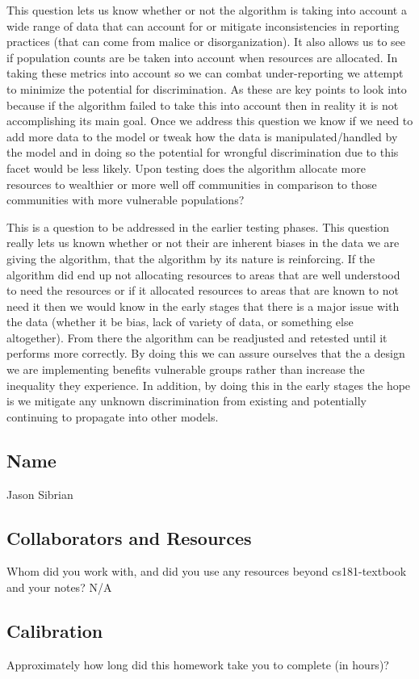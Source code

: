 \documentclass[submit]{harvardml}
\begin{document}
    This question lets us know whether or not the algorithm is taking into account a wide range of data that can account for or mitigate inconsistencies in reporting practices (that can come from malice or disorganization). It also allows us to see if population counts are be taken into account when resources are allocated. In taking these metrics into account so we can combat under-reporting we attempt to minimize the potential for discrimination. As these are key points to look into because if the algorithm failed to take this into account then in reality it is not accomplishing its main goal. Once we address this question we know if we need to add more data to the model or tweak how the data is manipulated/handled by the model and in doing so the potential for wrongful discrimination due to this facet would be less likely.
    \vspace{.5cm}
    \newline
    Upon testing does the algorithm allocate more resources to wealthier or more well off communities in comparison to those communities with more vulnerable populations?
    \vspace{.5cm}
    
    This is a question to be addressed in the earlier testing phases. This question really lets us known whether or not their are inherent biases in the data we are giving the algorithm, that the algorithm by its nature is reinforcing. If the algorithm did end up not allocating resources to areas that are well understood to need the resources or if it allocated resources to areas that are known to not need it then we would know in the early stages that there is a major issue with the data (whether it be bias, lack of variety of data, or something else altogether). From there the algorithm can be readjusted and retested until it performs more correctly. By doing this we can assure ourselves that the a design we are implementing benefits vulnerable groups rather than increase the inequality they experience. In addition, by doing this in the early stages the hope is we mitigate any unknown discrimination from existing and potentially continuing to propagate into other models.
    
\newpage
\subsection*{Name}
Jason Sibrian

\subsection*{Collaborators and Resources}
Whom did you work with, and did you use any resources beyond cs181-textbook and your notes?
\newline
N/A

\subsection*{Calibration}
Approximately how long did this homework take you to complete (in hours)? 
\end{document}
